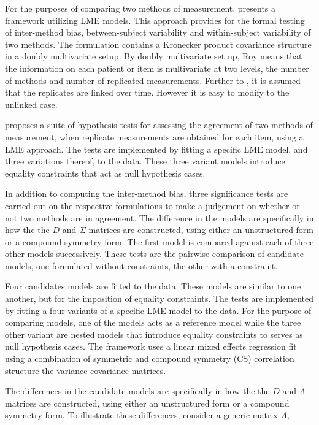 \documentclass[12pt, a4paper]{report}
\theoremstyle{plain}
\theoremstyle{definition}
\theoremstyle{remark}
\begin{document}
	For the purposes of comparing two methods of measurement, \citet{ARoy2009} presents a framework utilizing LME models. This approach provides for the formal testing of inter-method bias, between-subject variability and within-subject variability of two methods. The formulation contains a Kronecker product covariance structure in a doubly multivariate setup. By doubly multivariate set up, Roy means that the information on each patient or item is multivariate at two levels, the number of methods and number of replicated measurements. Further to \citet{lam}, it is assumed that the replicates are linked over time. However it is easy to modify to the unlinked case.
	
	\citet{ARoy2009} proposes a suite of hypothesis tests for assessing the agreement of two methods of measurement, when replicate measurements are obtained for each item, using a LME approach. The tests are implemented by fitting a specific LME model, and three variations thereof, to the data. These three variant models introduce equality constraints that act as null hypothesis cases.
	
	In addition to computing the inter-method bias, three significance tests are carried out on the respective formulations to make a judgement on whether or not two methods are in agreement. The difference in the models are specifically in how the the $D$ and $\Sigma$ matrices are constructed, using either an unstructured form or a compound symmetry form. The first model is compared against each of three other models successively. These tests are the pairwise comparison of candidate models, one formulated without constraints, the other with a constraint.
	
	
Four candidates models are fitted to the data. These models are similar to one another, but for the imposition of equality constraints. The tests are implemented by fitting a four variants of a specific LME model to the data. For the purpose of comparing models, one of the models acts as a reference model while the three other variant are nested models that introduce equality constraints to serves as null hypothesis cases. The framework uses a linear mixed effects regression fit using a combination of symmetric and compound symmetry (CS) correlation structure the variance covariance matrices.	
	
%	
 The differences in the candidate models are specifically in how the the $D$ and $\Lambda$ matrices are constructed, using either an unstructured form or a compound symmetry form. To illustrate these differences, consider a generic matrix $A$,
	
\end{document}
